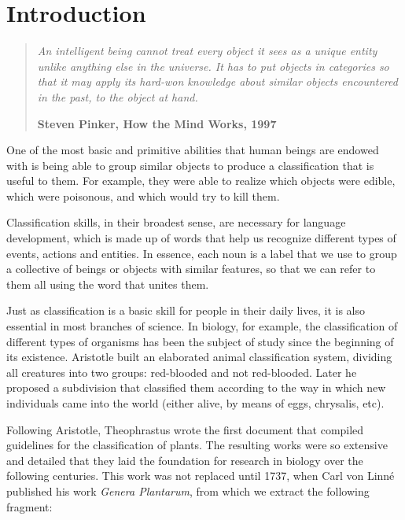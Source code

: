 
\chapter{Introduction}\label{ch:introduction}

\begin{quotation}{\slshape
		An intelligent being cannot treat every object it sees as a unique entity unlike anything else in the universe. It has to put objects in categories so that it may apply its hard-won knowledge about similar objects encountered in the past, to the object at hand.}
		\begin{flushright}
			\textbf{Steven Pinker, How the Mind Works, 1997} 
		\end{flushright}
\end{quotation}

One of the most basic and primitive abilities that human beings are endowed with is being able to group similar objects to produce a classification that is useful to them. For example, they were able to realize which objects were edible, which were poisonous, and which would try to kill them.

Classification skills, in their broadest sense, are necessary for language development, which is made up of words that help us recognize different types of events, actions and entities. In essence, each noun is a label that we use to group a collective of beings or objects with similar features, so that we can refer to them all using the word that unites them.

Just as classification is a basic skill for people in their daily lives, it is also essential in most branches of science. In biology, for example, the classification of different types of organisms has been the subject of study since the beginning of its existence. Aristotle built an elaborated animal classification system, dividing all creatures into two groups: red-blooded and not red-blooded. Later he proposed a subdivision that classified them according to the way in which new individuals came into the world (either alive, by means of eggs, chrysalis, etc).

Following Aristotle, Theophrastus wrote the first document that compiled guidelines for the classification of plants. The resulting works were so extensive and detailed that they laid the foundation for research in biology over the following centuries. This work was not replaced until 1737, when Carl von Linné published his work \textit{Genera Plantarum}, from which we extract the following fragment:

